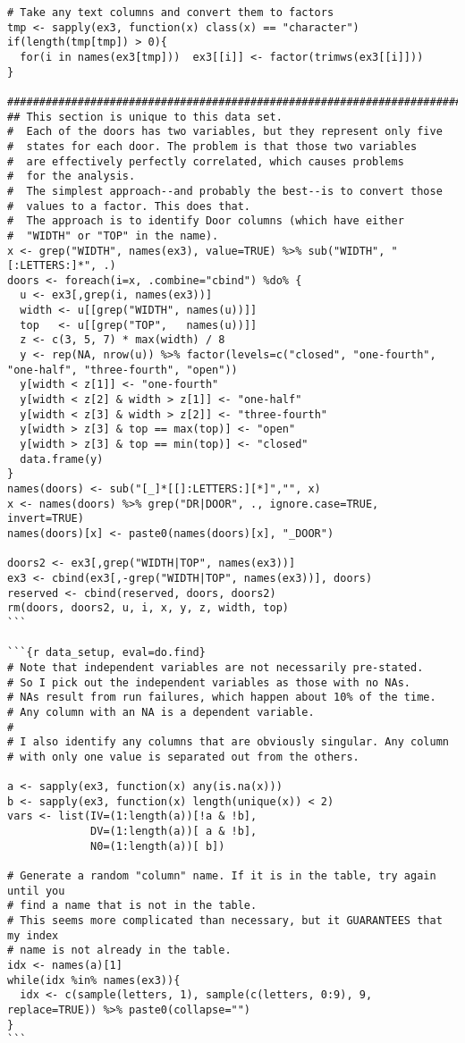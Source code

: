 \begin{lstlisting}[basicstyle=\scriptsize]
# Take any text columns and convert them to factors
tmp <- sapply(ex3, function(x) class(x) == "character")
if(length(tmp[tmp]) > 0){
  for(i in names(ex3[tmp]))  ex3[[i]] <- factor(trimws(ex3[[i]]))
}

#######################################################################
## This section is unique to this data set.
#  Each of the doors has two variables, but they represent only five
#  states for each door. The problem is that those two variables
#  are effectively perfectly correlated, which causes problems
#  for the analysis.
#  The simplest approach--and probably the best--is to convert those
#  values to a factor. This does that.
#  The approach is to identify Door columns (which have either
#  "WIDTH" or "TOP" in the name).
x <- grep("WIDTH", names(ex3), value=TRUE) %>% sub("WIDTH", "[:LETTERS:]*", .)
doors <- foreach(i=x, .combine="cbind") %do% {
  u <- ex3[,grep(i, names(ex3))]
  width <- u[[grep("WIDTH", names(u))]]
  top   <- u[[grep("TOP",   names(u))]]
  z <- c(3, 5, 7) * max(width) / 8
  y <- rep(NA, nrow(u)) %>% factor(levels=c("closed", "one-fourth", "one-half", "three-fourth", "open"))
  y[width < z[1]] <- "one-fourth"
  y[width < z[2] & width > z[1]] <- "one-half"
  y[width < z[3] & width > z[2]] <- "three-fourth"
  y[width > z[3] & top == max(top)] <- "open"
  y[width > z[3] & top == min(top)] <- "closed"
  data.frame(y)
}
names(doors) <- sub("[_]*[[]:LETTERS:][*]","", x)
x <- names(doors) %>% grep("DR|DOOR", ., ignore.case=TRUE, invert=TRUE)
names(doors)[x] <- paste0(names(doors)[x], "_DOOR")

doors2 <- ex3[,grep("WIDTH|TOP", names(ex3))]
ex3 <- cbind(ex3[,-grep("WIDTH|TOP", names(ex3))], doors)
reserved <- cbind(reserved, doors, doors2)
rm(doors, doors2, u, i, x, y, z, width, top)
```

```{r data_setup, eval=do.find}
# Note that independent variables are not necessarily pre-stated.
# So I pick out the independent variables as those with no NAs.
# NAs result from run failures, which happen about 10% of the time.
# Any column with an NA is a dependent variable.
#
# I also identify any columns that are obviously singular. Any column
# with only one value is separated out from the others.

a <- sapply(ex3, function(x) any(is.na(x)))
b <- sapply(ex3, function(x) length(unique(x)) < 2)
vars <- list(IV=(1:length(a))[!a & !b],
             DV=(1:length(a))[ a & !b],
             N0=(1:length(a))[ b])

# Generate a random "column" name. If it is in the table, try again until you
# find a name that is not in the table.
# This seems more complicated than necessary, but it GUARANTEES that my index
# name is not already in the table.
idx <- names(a)[1]
while(idx %in% names(ex3)){
  idx <- c(sample(letters, 1), sample(c(letters, 0:9), 9, replace=TRUE)) %>% paste0(collapse="")
}
```


\end{lstlisting}

